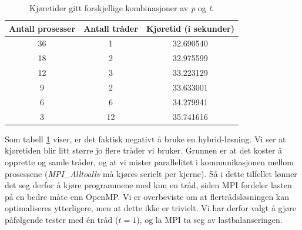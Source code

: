 \documentclass{article}
\begin{document}
\begin{table}
\begin{center}
	
	\begin{tabular}{c | c | c}
	\hline \hline 
	Antall prosesser      &    Antall tråder     &    Kjøretid (i sekunder) 	    \\ \hline	
	36		      &		1	     &	  32.690540       		    \\ \hline
	18		      &         2	     &    32.975599       		    \\ \hline
	12		      &         3	     &    33.223129	    		    \\ \hline
	9   		      &		2	     &    33.633001	    		    \\ \hline
	6		      &         6	     &    34.279941	    		    \\ \hline
	3		      &		12	     &    35.741616	    		    \\ \hline
	
	\end{tabular}
\end{center}
\caption{Kjøretider gitt forskjellige kombinasjoner av \emph{p} og \emph{t}.}
\label{p/t-table}
\end{table}

Som tabell \ref{p/t-table} viser, er det faktisk negativt å bruke en hybrid-løsning. Vi ser at kjøretiden blir litt større jo flere tråder vi bruker. Grunnen er at det koster å opprette og samle tråder, og at vi mister parallelitet i kommunikasjonen mellom prosessene (\emph{MPI\_Alltoallv} må kjøres serielt per kjerne). Så i dette tilfellet lønner det seg derfor å kjøre programmene med kun en tråd, siden MPI fordeler lasten på en bedre måte enn OpenMP. Vi er overbeviste om at flertrådsløsningen kan optimaliseres ytterligere, men at dette ikke er trivielt. Vi har derfor valgt å gjøre påfølgende tester med én tråd ($t=1$), og la MPI ta seg av lastbalanseringen.
\end{document}
